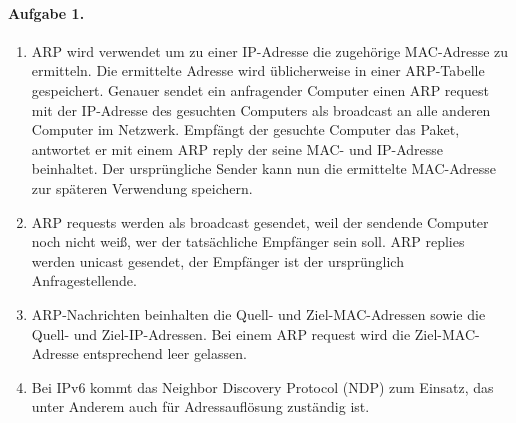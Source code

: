 \documentclass{article}
\begin{document}
\paragraph{Aufgabe 1.}

\begin{enumerate}
    \item ARP wird verwendet um zu einer IP-Adresse die zugehörige MAC-Adresse zu ermitteln. Die ermittelte Adresse wird üblicherweise in einer ARP-Tabelle gespeichert. Genauer sendet ein anfragender Computer einen ARP request mit der IP-Adresse des gesuchten Computers als broadcast an alle anderen Computer im Netzwerk. Empfängt der gesuchte Computer das Paket, antwortet er mit einem ARP reply der seine MAC- und IP-Adresse beinhaltet. Der ursprüngliche Sender kann nun die ermittelte MAC-Adresse zur späteren Verwendung speichern.
    
    \item ARP requests werden als broadcast gesendet, weil der sendende Computer noch nicht weiß, wer der tatsächliche Empfänger sein soll. ARP replies werden unicast gesendet, der Empfänger ist der ursprünglich Anfragestellende.
    
    \item ARP-Nachrichten beinhalten die Quell- und Ziel-MAC-Adressen sowie die Quell- und Ziel-IP-Adressen. Bei einem ARP request wird die Ziel-MAC-Adresse entsprechend leer gelassen.
    
    \item Bei IPv6 kommt das Neighbor Discovery Protocol (NDP) zum Einsatz, das unter Anderem auch für Adressauflösung zuständig ist.
\end{enumerate}


\end{document}
